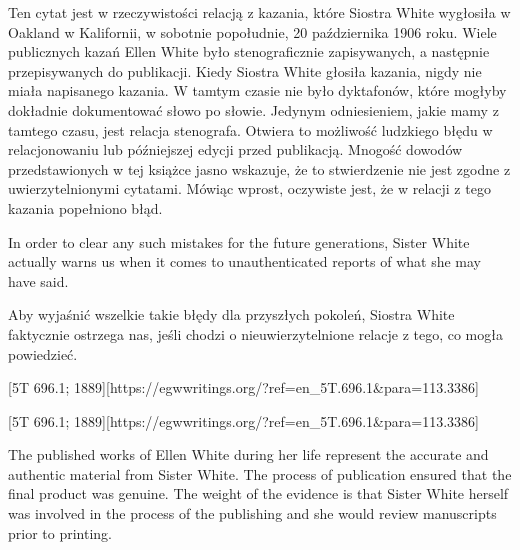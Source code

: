 Ten cytat jest w rzeczywistości relacją z kazania, które Siostra White wygłosiła w Oakland w Kalifornii, w sobotnie popołudnie, 20 października 1906 roku. Wiele publicznych kazań Ellen White było stenograficznie zapisywanych, a następnie przepisywanych do publikacji. Kiedy Siostra White głosiła kazania, nigdy nie miała napisanego kazania. W tamtym czasie nie było dyktafonów, które mogłyby dokładnie dokumentować słowo po słowie. Jedynym odniesieniem, jakie mamy z tamtego czasu, jest relacja stenografa. Otwiera to możliwość ludzkiego błędu w relacjonowaniu lub późniejszej edycji przed publikacją. Mnogość dowodów przedstawionych w tej książce jasno wskazuje, że to stwierdzenie nie jest zgodne z uwierzytelnionymi cytatami. Mówiąc wprost, oczywiste jest, że w relacji z tego kazania popełniono błąd.


In order to clear any such mistakes for the future generations, Sister White actually warns us when it comes to unauthenticated reports of what she may have said.


Aby wyjaśnić wszelkie takie błędy dla przyszłych pokoleń, Siostra White faktycznie ostrzega nas, jeśli chodzi o nieuwierzytelnione relacje z tego, co mogła powiedzieć.


[5T 696.1; 1889][https://egwwritings.org/?ref=en\_5T.696.1&para=113.3386]


[5T 696.1; 1889][https://egwwritings.org/?ref=en\_5T.696.1&para=113.3386]


The published works of Ellen White during her life represent the accurate and authentic material from Sister White. The process of publication ensured that the final product was genuine. The weight of the evidence is that Sister White herself was involved in the process of the publishing and she would review manuscripts prior to printing.


